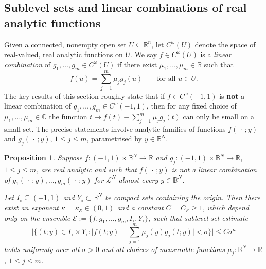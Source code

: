 \documentclass[reqno]{amsart}
\numberwithin{equation}{section}
\newcommand{\B}{\mathbb{B}}
\newcommand{\C}{\mathbb{C}}
\newcommand{\R}{\mathbb{R}}
\newcommand{\cL}{\mathcal{L}}
\newcommand{\sE}{\mathscr{E}}
\theoremstyle{plain}
\newtheorem{proposition}[theorem]{Proposition}
\theoremstyle{definition}
\begin{document}


\subsection{Sublevel sets and linear combinations of real analytic functions} Given a connected, nonempty open set $U \subseteq \R^n$, let $C^{\omega}(U)$ denote the space of real-valued, real analytic functions on $U$. We say $f \in C^{\omega}(U)$ is a \textit{linear combination} of $g_1, \dots, g_m \in C^{\omega}(U)$ if there exist $\mu_1, \dots, \mu_m \in \R$ such that
\begin{equation*}
f(u) = \sum_{j=1}^m \mu_j g_j(u) \qquad \textrm{for all $u \in U$.}
\end{equation*}
The key results of this section roughly state that if $f \in C^{\omega}(-1,1)$ is \textbf{not} a linear combination of $g_1, \dots, g_m \in C^{\omega}(-1,1)$, then for any fixed choice of $\mu_1, \dots, \mu_m \in \C$ the function $t \mapsto f(t) - \sum_{j=1}^m \mu_j g_j(t)$ can only be small on a small set. The precise statements involve analytic families of functions $f(\,\cdot\,;y)$ and $g_j(\,\cdot\,;y)$, $1 \leq j \leq m$, parametrised by $y \in \B^N$. 


\begin{proposition}\label{prop: sublevel} Suppose $f \colon (-1,1) \times \B^N \to \R$ and $g_j \colon (-1,1) \times \B^N \to \R$, $1 \leq j \leq m$, are real analytic and such that $f(\,\cdot\,; y)$ is not a linear combination of $g_1(\,\cdot\,; y), \dots, g_m(\,\cdot\,; y)$ for $\cL^{N}$-almost every $y \in \B^N$.

Let $I_{\circ} \subseteq (-1,1)$ and $Y_{\circ} \subset \B^N$ be compact sets containing the origin. Then there exist an exponent $\kappa = \kappa_{\sE}  \in (0,1)$ and a constant $C = C_\sE \geq 1$, which depend only on the ensemble $\sE := \{f, g_1, \dots, g_m, I_{\circ}, Y_{\circ}\}$, such that sublevel set estimate
\begin{equation}\label{eq: sublevel}
 \Big|\Big\{(t; y) \in I_{\circ} \times Y_{\circ} : \big|f(t;y) - \sum_{j=1}^m \mu_j(y) g_j(t;y)\big| < \sigma\Big\}\Big|\leq C \sigma^{\kappa}
\end{equation}
holds uniformly over all $\sigma > 0$ and all choices of measurable functions $\mu_j \colon \B^N \to \R$, $1 \leq j \leq m$. 
\end{proposition}
\end{document}
